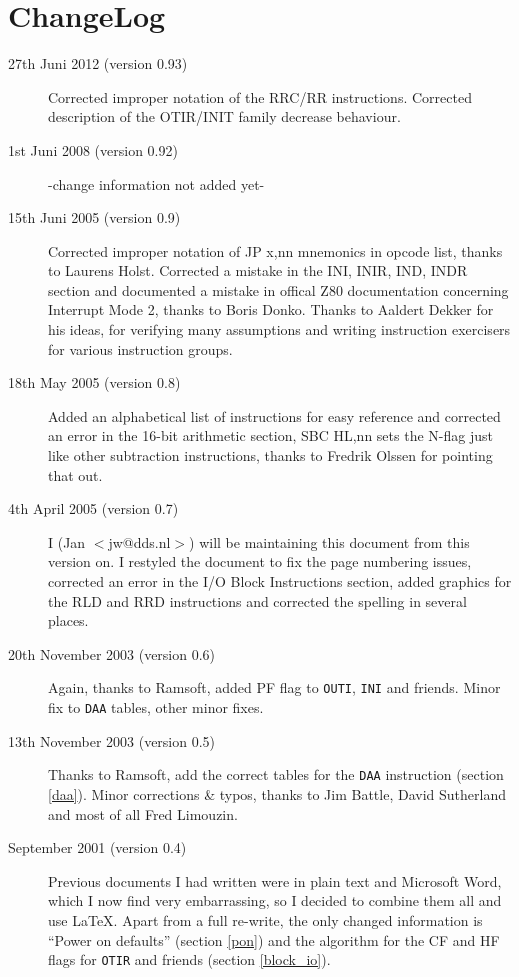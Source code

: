 \documentclass[oneside,a4paper]{book}
\begin{document}
\section{ChangeLog}
\begin{description}

\item[27th Juni 2012 (version 0.93)] 
Corrected improper notation of the RRC/RR instructions.
Corrected description of the OTIR/INIT family decrease behaviour.

\item[1st Juni 2008 (version 0.92)] 
-change information not added yet-

\item[15th Juni 2005 (version 0.9)] 
Corrected improper notation of JP x,nn mnemonics in opcode list, thanks to
Laurens Holst. Corrected a mistake in the INI, INIR, IND, INDR section 
and documented a mistake in offical Z80 documentation concerning Interrupt 
Mode 2, thanks to Boris Donko. Thanks to Aaldert Dekker for his ideas, for 
verifying many assumptions and writing instruction exercisers for various 
instruction groups.

\item[18th May 2005 (version 0.8)] 
Added an alphabetical list of instructions for easy reference and corrected an 
error in the 16-bit arithmetic section, SBC HL,nn sets the N-flag just like
other subtraction instructions, thanks to Fredrik Olssen for pointing that out.

\item[4th April 2005 (version 0.7)] 
I (Jan $<$jw@dds.nl$>$) will be maintaining this document from this version on.
I restyled the document to fix the page numbering issues, 
corrected an error in the I/O Block Instructions section, added 
graphics for the RLD and RRD instructions and corrected the spelling in several places.

\item[20th November 2003 (version 0.6)] 
Again, thanks to Ramsoft, added PF flag to {\tt OUTI}, {\tt INI} and
friends. Minor fix to {\tt DAA} tables, other minor fixes.

\item[13th November 2003 (version 0.5)]
Thanks to Ramsoft, add the correct tables for the {\tt DAA} instruction
(section \ref{daa}). Minor corrections \& typos, thanks to Jim Battle,
David Sutherland and most of all Fred Limouzin.

\item[September 2001 (version 0.4)]
Previous documents I had written were in plain text and Microsoft
Word, which I now find very embarrassing, so I decided to combine them all 
and use {\LaTeX}. Apart from a full re-write, the only changed information is
``Power on defaults'' (section \ref{pon}) and the algorithm for the CF 
and HF flags for {\tt OTIR} and friends (section \ref{block_io}).

\end{description}
\end{document}
